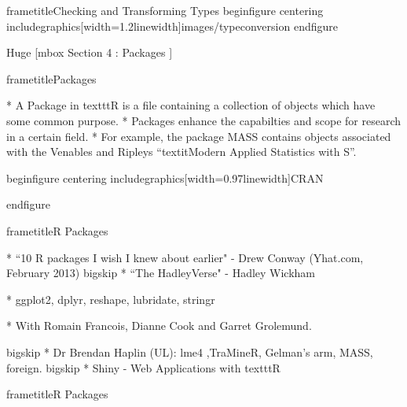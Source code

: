  		
 			
 				frametitle{Checking and Transforming Types}	
 			begin{figure}
 				centering
 				includegraphics[width=1.2linewidth]{images/typeconversion} 
 			end{figure}
 		   
 	
 	
 		Huge
 		[mbox{ Section 4 : Packages } ]
 	
 	
 		frametitle{Packages}
 		
 		
 			         * A Package in texttt{R} is a file containing a collection of objects which have some common purpose.
 			         * Packages enhance the capabilties and scope for research in a certain field. 
 			         * For example, the
 			package MASS contains objects associated with the Venables and Ripleys ``textit{Modern Applied
 				Statistics with S}”. 
 		
 		
 	
 	
 		
 		
 		begin{figure}
 			centering
 			includegraphics[width=0.97linewidth]{CRAN}
 			
 		end{figure}
 		
 		
 	
 	
 	
 	 
 		frametitle{R Packages}
 		
 		
 			         * ``10 R packages I wish I knew about earlier" - Drew Conway (Yhat.com, February 2013)
 			bigskip          * ``The HadleyVerse" - Hadley Wickham
 			
 				
 				          * ggplot2, dplyr, reshape, lubridate, stringr
 				
 				          * With Romain Francois, Dianne Cook and Garret Grolemund.
 			
 			bigskip
 			         * Dr Brendan Haplin (UL): lme4 ,TraMineR, Gelman's arm, MASS, foreign. 
 			bigskip
 			         * Shiny - Web Applications with texttt{R}
 		
 	
 	 
 		frametitle{R Packages}
 		
